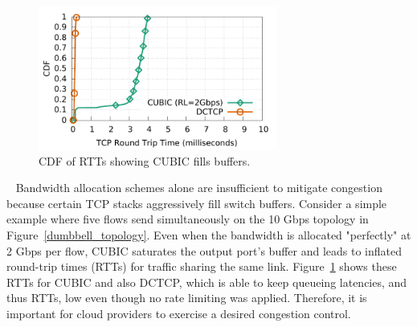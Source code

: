 

\begin{figure}[!t]
        \centering
  \includegraphics[width=0.7\textwidth]{acdctcp/figures/motivation/motivation_2Gbps_cubic_rl_dctcp_sockperf.pdf}
        \caption{CDF of RTTs showing CUBIC fills buffers.}
        \label{cubic-fill}
\end{figure}
~
Bandwidth allocation schemes alone are insufficient to mitigate congestion because certain TCP stacks aggressively
fill switch buffers. Consider a simple example where five flows send simultaneously
on the 10 Gbps topology in Figure~\ref{dumbbell_topology}. Even when the bandwidth is allocated "perfectly"
at 2 Gbps per flow, CUBIC saturates the output port's buffer and leads to inflated round-trip times (RTTs) for traffic
sharing the same link.
Figure~\ref{cubic-fill} shows these RTTs for CUBIC and also DCTCP, 
which is able to keep queueing latencies, and thus RTTs, low even though no rate limiting was applied.
Therefore, it is important for cloud providers to exercise a desired congestion
control.

